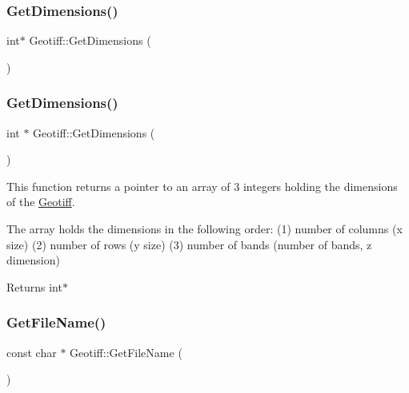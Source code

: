 \mbox{\label{class_geotiff_af33fcb14ff4dae4a151080b00032fcc1}} 
\subsubsection{\texorpdfstring{Get\+Dimensions()}{GetDimensions()}\hspace{0.1cm}{\footnotesize\ttfamily [1/2]}}
{\footnotesize\ttfamily int$\ast$ Geotiff\+::\+Get\+Dimensions (\begin{DoxyParamCaption}{ }\end{DoxyParamCaption})}

\mbox{\label{class_geotiff_af192cd1890942ff57d072d4730210523}} 
\subsubsection{\texorpdfstring{Get\+Dimensions()}{GetDimensions()}\hspace{0.1cm}{\footnotesize\ttfamily [2/2]}}
{\footnotesize\ttfamily int $\ast$ Geotiff\+::\+Get\+Dimensions (\begin{DoxyParamCaption}{ }\end{DoxyParamCaption})}



This function returns a pointer to an array of 3 integers holding the dimensions of the \hyperlink{class_geotiff}{Geotiff}. 

The array holds the dimensions in the following order\+: (1) number of columns (x size) (2) number of rows (y size) (3) number of bands (number of bands, z dimension) \begin{DoxyReturn}{Returns}
int$\ast$ 
\end{DoxyReturn}
\mbox{\label{class_geotiff_ab5ba8ecf1483c3808285c7394c26d556}} 
\subsubsection{\texorpdfstring{Get\+File\+Name()}{GetFileName()}\hspace{0.1cm}{\footnotesize\ttfamily [1/2]}}
{\footnotesize\ttfamily const char $\ast$ Geotiff\+::\+Get\+File\+Name (\begin{DoxyParamCaption}{ }\end{DoxyParamCaption})}




